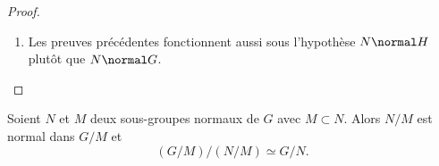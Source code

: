 \begin{proof}
\begin{enumerate}
            Le premier théorème d'isomorphisme implique alors que \( H/\Kernel f\simeq \Image f\), c'est-à-dire
            \begin{equation}
                H/N\cap H\simeq HN/N.
            \end{equation}
       \item
          Les preuves précédentes fonctionnent aussi sous l'hypothèse \( N \normal H \) plutôt que \( N \normal G \).
    \end{enumerate}
\end{proof}

\begin{theorem}  \label{ThoezgBep}
    Soient \( N\) et \( M\) deux sous-groupes normaux de \( G\) avec \( M\subset N\). Alors \( N/M\) est normal dans \( G/M\) et
    \begin{equation}
        (G/M)/(N/M)\simeq G/N.
    \end{equation}
\end{theorem}

